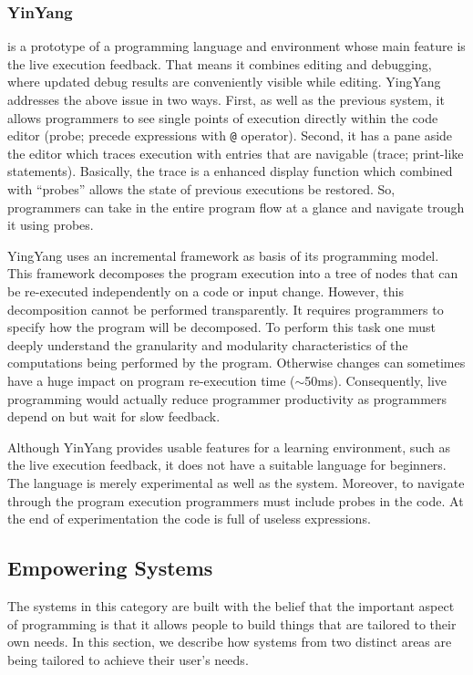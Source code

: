 \subsubsection{YinYang~\cite{mcdirmid2013usable}} is a prototype of a programming language and environment whose main feature is the live execution feedback. That means it combines editing and debugging, where updated debug results are conveniently visible while editing. YingYang addresses the above issue in two ways. First, as well as the previous system, it allows programmers to see single points of execution directly within the code editor (probe; precede expressions with \texttt{@} operator). Second, it has a pane aside the editor which traces execution with entries that are navigable (trace; print-like statements). Basically, the trace is a enhanced display function which combined with ``probes'' allows the state of previous executions be restored. So, programmers can take in the entire program flow at a glance and navigate trough it using probes.

YingYang uses an incremental framework as basis of its programming model. This framework decomposes the program execution into a tree of nodes that can be re-executed independently on a code or input change. However, this decomposition cannot be performed transparently. It requires programmers to specify how the program will be decomposed. To perform this task one must deeply understand the granularity and modularity characteristics of the computations being performed by the program. Otherwise changes can sometimes have a huge impact on program re-execution time ($\sim$50ms). Consequently, live programming would actually reduce programmer productivity as programmers depend on but wait for slow feedback.

Although YinYang provides usable features for a learning environment, such as the live execution feedback, it does not have a suitable language for beginners. The language is merely experimental as well as the system. Moreover, to navigate through the program execution programmers must include probes in the code. At the end of experimentation the code is full of useless expressions.

\subsection{Empowering Systems}

The systems in this category are built with the belief that the important aspect of programming is that it allows people to build things that are tailored to their own needs. In this section, we describe how systems from two distinct areas are being tailored to achieve their user's needs. 


